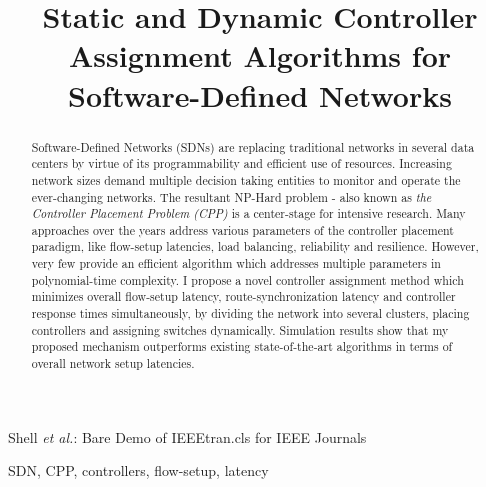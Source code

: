 \documentclass[journal]{IEEEtran}
\begin{document}
\title{Static and Dynamic Controller Assignment Algorithms for Software-Defined Networks}

\author{
	
	}

%
{Shell \MakeLowercase{\textit{et al.}}: Bare Demo of IEEEtran.cls for IEEE Journals}

\maketitle

\begin{abstract}
Software-Defined Networks (SDNs) are replacing traditional networks in several data centers by virtue of its programmability and efficient use of resources. Increasing network sizes demand multiple decision taking entities to monitor and operate the ever-changing networks. The resultant NP-Hard problem - also known as \textit{the Controller Placement Problem (CPP)} is a center-stage for intensive research. Many approaches over the years address various parameters of the controller placement paradigm, like flow-setup latencies, load balancing, reliability and resilience. However, very few provide an efficient algorithm which addresses multiple parameters in polynomial-time complexity. I propose a novel controller assignment method which minimizes overall flow-setup latency, route-synchronization latency and controller response times simultaneously, by dividing the network into several clusters, placing controllers and assigning switches dynamically. Simulation results show that my proposed mechanism outperforms existing state-of-the-art algorithms in terms of overall network setup latencies.
\end{abstract}

\begin{IEEEkeywords}
SDN, CPP, controllers, flow-setup, latency
\end{IEEEkeywords}






%
\IEEEpeerreviewmaketitle
\end{document}
